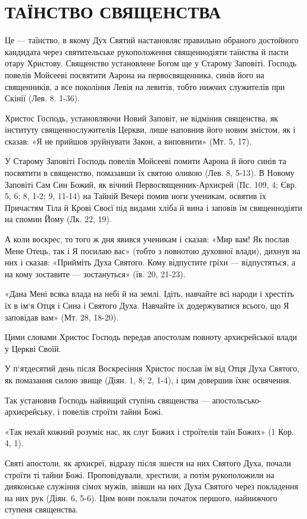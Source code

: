 \documentclass[main.tex]{subfiles}
\begin{document}
\section{ТАЇНСТВО СВЯЩЕНСТВА}

Це — таїнство, в якому Дух Святий настановляє правильно обраного достойного кандидата через святительське рукоположення священнодіяти таїнства й пасти отару Христову. Священство установлене Богом ще у Старому Заповіті. Господь повелів Мойсееві посвятити Аарона на первосвященника, синів його на священників, а все покоління Левія на левитів, тобто нижчих служителів при Скінії (Лев. 8. 1-36).

Христос Господь, установляючи Новий Заповіт, не відмінив священства, як інституту священнослужителів Церкви, лише наповнив його новим змістом, як і сказав: «Я не прийшов зруйнувати Закон, а виповнити» (Мт. 5, 17).

У Старому Заповіті Господь повелів Мойсееві помити Аарона й його синів та посвятити в священство, помазавши їх святою оливою (Лев. 8, 5-13). В Новому Заповіті Сам Син Божий, як вічний Первосвященник-Архиєрей (Пс. 109, 4; Євр. 5, 6; 8, 1-2; 9, 11-14) на Тайній Вечері помив ноги ученикам, освятив їх Причастям Тіла й Крові Своєї під видами хліба й вина і заповів їм священнодіяти на спомин Йому (Лк. 22, 19).

А коли воскрес, то того ж дня явився ученикам і сказав: «Мир вам! Як послав Мене Отець, так і Я посилаю вас» (тобто з повнотою духовної влади), дихнув на них і сказав: «Прийміть Духа Святого. Кому відпустите гріхи — відпустяться, а на кому зоставите — зостануться» (їв. 20, 21-23).

«Дана Мені всяка влада на небі й на землі. Ідіть, навчайте всі народи і хрестіть їх в ім`я Отця і Сина і Святого Духа. Навчайте їх додержуватися всього, що Я заповідав вам» (Мт. 28, 18-20).

Цими словами Христос Господь передав апостолам повноту архиєрейської влади у Церкві Своїй.

У п`ятдесятий день після Воскресіння Христос послав їм від Отця Духа Святого, як помазання силою звище (Діян. 1, 8; 2, 1-4), і цим довершив їхнє освячення.

Так установив Господь найвищий ступінь священства — апостольсько-архиєрейську, і повелів строїти тайни Божі.

«Так нехай кожний розуміє нас, як слуг Божих і строїтелів таїн Божих» (1 Кор. 4, 1).

Святі апостоли, як архиєреї, відразу після зшестя на них Святого Духа, почали строїти ті тайни Божі. Проповідували, хрестили, а потім рукоположили на дияконське служіння сімох мужів, звівши на них Духа Святого через покладення на них рук (Діян. 6, 5-6). Цим вони поклали початок першого, найнижчого ступеня священства.
\end{document}
